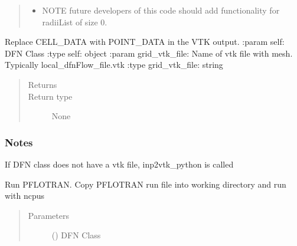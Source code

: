 \documentclass[letterpaper,10pt,english]{sphinxmanual}
\begin{document}
\begin{fulllineitems}
\begin{fulllineitems}
\begin{quote}
\begin{description}
\begin{itemize}
\item {} 
NOTE future developers of this code should add functionality for radiiList of size 0.

\end{itemize}

\end{description}
\end{quote}

\end{fulllineitems}


\begin{fulllineitems}
\label{\detokenize{pydfnworks:pydfnworks.general.dfnworks.DFNWORKS.parse_pflotran_vtk_python}}
Replace CELL\_DATA with POINT\_DATA in the VTK output.
:param self: DFN Class
:type self: object
:param grid\_vtk\_file: Name of vtk file with mesh. Typically local\_dfnFlow\_file.vtk
:type grid\_vtk\_file: string
\begin{quote}\begin{description}
\item[{Returns}] \leavevmode


\item[{Return type}] \leavevmode
None

\end{description}\end{quote}
\subsubsection*{Notes}

If DFN class does not have a vtk file, inp2vtk\_python is called

\end{fulllineitems}


\begin{fulllineitems}
\label{\detokenize{pydfnworks:pydfnworks.general.dfnworks.DFNWORKS.pflotran}}
Run PFLOTRAN. Copy PFLOTRAN run file into working directory and run with ncpus
\begin{quote}\begin{description}
\item[{Parameters}] \leavevmode
{} () \textendash{} DFN Class


\end{description}
\end{quote}
\end{fulllineitems}
\end{fulllineitems}
\end{document}
